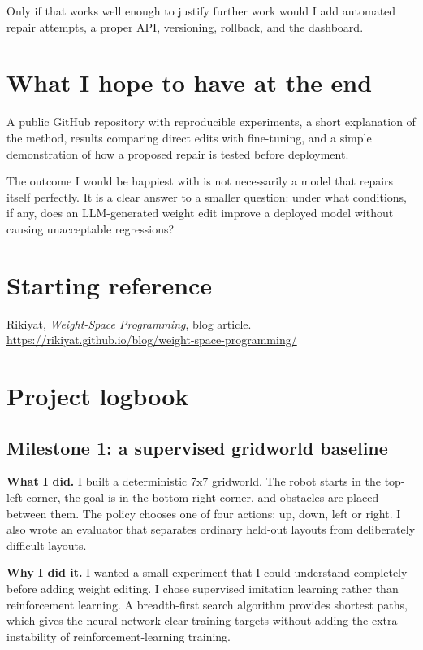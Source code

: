 \documentclass[11pt,a4paper]{article}
\begin{document}
Only if that works well enough to justify further work would I add automated repair attempts, a proper API, versioning, rollback, and the dashboard.

\section*{What I hope to have at the end}
A public GitHub repository with reproducible experiments, a short explanation of the method, results comparing direct edits with fine-tuning, and a simple demonstration of how a proposed repair is tested before deployment.

The outcome I would be happiest with is not necessarily a model that repairs itself perfectly. It is a clear answer to a smaller question: under what conditions, if any, does an LLM-generated weight edit improve a deployed model without causing unacceptable regressions?

\section*{Starting reference}
Rikiyat, \emph{Weight-Space Programming}, blog article.\\
\url{https://rikiyat.github.io/blog/weight-space-programming/}

\section*{Project logbook}

\subsection*{Milestone 1: a supervised gridworld baseline}

\textbf{What I did.}
I built a deterministic 7x7 gridworld. The robot starts in the top-left corner, the goal is in the bottom-right corner, and obstacles are placed between them. The policy chooses one of four actions: up, down, left or right. I also wrote an evaluator that separates ordinary held-out layouts from deliberately difficult layouts.

\textbf{Why I did it.}
I wanted a small experiment that I could understand completely before adding weight editing. I chose supervised imitation learning rather than reinforcement learning. A breadth-first search algorithm provides shortest paths, which gives the neural network clear training targets without adding the extra instability of reinforcement-learning training.
\end{document}
